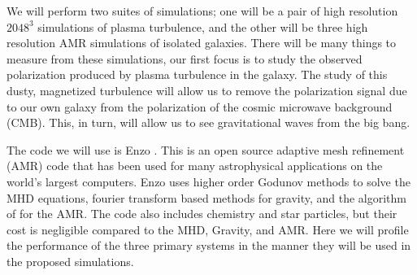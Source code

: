 

We will perform two suites of simulations; one will be a pair of high resolution $2048^3$
simulations of plasma turbulence, and the other will be three high resolution
AMR simulations of isolated galaxies.  There will be many things to measure from
these simulations, our first focus is to study the observed polarization produced by
plasma turbulence in the galaxy.  The study of this dusty, magnetized turbulence
will allow us to remove the polarization signal due to our own galaxy from the
polarization of the cosmic microwave background (CMB).  This, in turn, will
allow us to see gravitational waves from the big bang.

The code we will use is Enzo \citep{Collins10, Bryan14}.  This is an open source
adaptive mesh refinement (AMR) code that has been used for many astrophysical
applications on the world's largest computers.  Enzo uses higher order Godunov
methods to solve the MHD equations, fourier transform based methods for gravity,
and the algorithm of \citet{Berger89} for the AMR.  The code also includes
chemistry and star particles, but their cost is negligible compared to the MHD,
Gravity, and AMR.  Here we will profile the performance of the three primary
systems in the manner they will be used in the proposed simulations.
